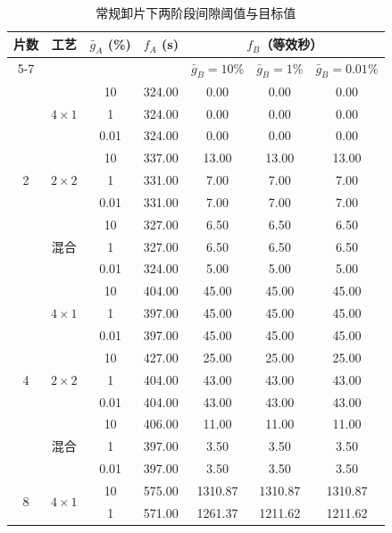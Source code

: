 \documentclass[preprint,12pt,nonatbib]{elsarticle}
\begin{document}
\begin{table}[!htbp]
\centering\small
\caption{常规卸片下两阶段间隙阈值与目标值}
\label{tab:certified-grid-cn}
\setlength{\tabcolsep}{5pt}
\renewcommand{\arraystretch}{1.0}
\begin{tabular}{@{}ccccccc@{}}\toprule
\multirow{2}{*}{片数} & \multirow{2}{*}{工艺} & \multirow{2}{*}{$\bar g_A$ (\%)} & \multirow{2}{*}{$f_A$ (s)} & \multicolumn{3}{c}{$f_B$（等效秒）}\\
\cmidrule(l){5-7}
 & & & & $\bar g_B{=}10\%$ & $\bar g_B{=}1\%$ & $\bar g_B{=}0.01\%$\\\midrule
\multirow{9}{*}{2} & \multirow{3}{*}{$4\times1$} & 10 & 324.00 & 0.00 & 0.00 & 0.00\\
 &  & 1 & 324.00 & 0.00 & 0.00 & 0.00\\
 &  & 0.01 & 324.00 & 0.00 & 0.00 & 0.00\\
\cmidrule(l){2-7}
 & \multirow{3}{*}{$2\times2$} & 10 & 337.00 & 13.00 & 13.00 & 13.00\\
 &  & 1 & 331.00 & 7.00 & 7.00 & 7.00\\
 &  & 0.01 & 331.00 & 7.00 & 7.00 & 7.00\\
\cmidrule(l){2-7}
 & \multirow{3}{*}{混合} & 10 & 327.00 & 6.50 & 6.50 & 6.50\\
 &  & 1 & 327.00 & 6.50 & 6.50 & 6.50\\
 &  & 0.01 & 324.00 & 5.00 & 5.00 & 5.00\\
\midrule
\multirow{9}{*}{4} & \multirow{3}{*}{$4\times1$} & 10 & 404.00 & 45.00 & 45.00 & 45.00\\
 &  & 1 & 397.00 & 45.00 & 45.00 & 45.00\\
 &  & 0.01 & 397.00 & 45.00 & 45.00 & 45.00\\
\cmidrule(l){2-7}
 & \multirow{3}{*}{$2\times2$} & 10 & 427.00 & 25.00 & 25.00 & 25.00\\
 &  & 1 & 404.00 & 43.00 & 43.00 & 43.00\\
 &  & 0.01 & 404.00 & 43.00 & 43.00 & 43.00\\
\cmidrule(l){2-7}
 & \multirow{3}{*}{混合} & 10 & 406.00 & 11.00 & 11.00 & 11.00\\
 &  & 1 & 397.00 & 3.50 & 3.50 & 3.50\\
 &  & 0.01 & 397.00 & 3.50 & 3.50 & 3.50\\
\midrule
\multirow{9}{*}{8} & \multirow{3}{*}{$4\times1$} & 10 & 575.00 & 1310.87 & 1310.87 & 1310.87\\
 &  & 1 & 571.00 & 1261.37 & 1211.62 & 1211.62\\

\end{tabular}
\end{table}
\end{document}
